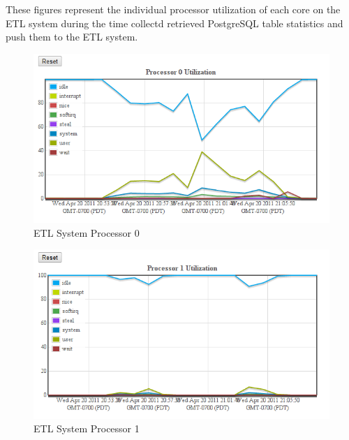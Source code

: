 \documentclass[twocolumn,letterpaper]{article}
\begin{document}
These figures represent the individual processor utilization of each core on
the ETL system during the time collectd retrieved PostgreSQL table statistics
and push them to the ETL system.

\begin{figure}[ht]
  \begin{center}
    \includegraphics[scale=0.37]{collectd-c10-cpu-00}
  \end{center}
  \caption{ETL System Processor 0}
  \label{collectd-c10-cpu00}
\end{figure}

\begin{figure}[ht]
  \begin{center}
    \includegraphics[scale=0.37]{collectd-c10-cpu-01}
  \end{center}
  \caption{ETL System Processor 1}
\end{figure}
\end{document}
